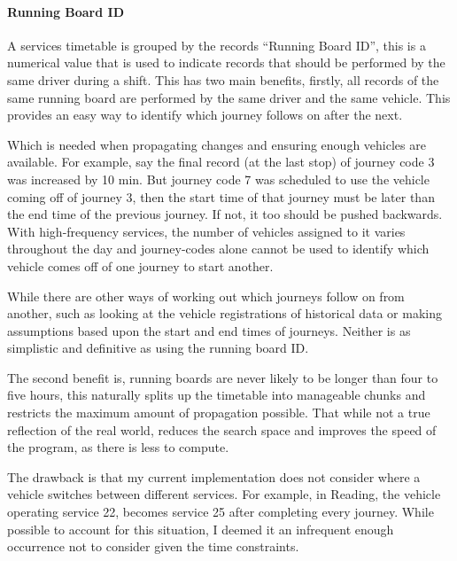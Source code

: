 \documentclass{article}
\begin{document}
\paragraph{Running Board ID} 

A services timetable is grouped by the records ``Running Board ID'', this is a numerical value that is used to indicate records that should be performed by the same driver during a shift. This has two main benefits, firstly, all records of the same running board are performed by the same driver and the same vehicle. This provides an easy way to identify which journey follows on after the next. 

\par
Which is needed when propagating changes and ensuring enough vehicles are available. For example, say the final record (at the last stop) of journey code 3 was increased by 10 min. But journey code 7 was scheduled to use the vehicle coming off of journey 3, then the start time of that journey must be later than the end time of the previous journey. If not, it too should be pushed backwards. With high-frequency services, the number of vehicles assigned to it varies throughout the day and journey-codes alone cannot be used to identify which vehicle comes off of one journey to start another. 

\par 
While there are other ways of working out which journeys follow on from another, such as looking at the vehicle registrations of historical data or making assumptions based upon the start and end times of journeys. Neither is as simplistic and definitive as using the running board ID.

\par 
The second benefit is, running boards are never likely to be longer than four to five hours, this naturally splits up the timetable into manageable chunks and restricts the maximum amount of propagation possible. That while not a true reflection of the real world, reduces the search space and improves the speed of the program, as there is less to compute. 


\par
The drawback is that my current implementation does not consider where a vehicle switches between different services. For example, in Reading, the vehicle operating service 22, becomes service 25 after completing every journey. While possible to account for this situation, I deemed it an infrequent enough occurrence not to consider given the time constraints.
\end{document}
